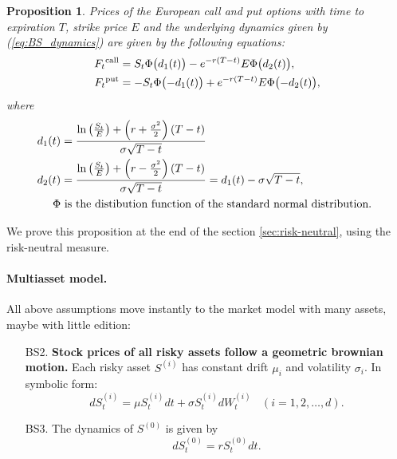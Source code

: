 \documentclass[a4paper,12pt, oneside]{book}
\newtheorem{prop}[thm]{Proposition}
\theoremstyle{definition}
\theoremstyle{remark}
\begin{document}
\begin{prop}
\label{prop:BSFormula}
Prices of the European call and put options with time to expiration $T$, strike price $E$ and the underlying dynamics given by (\ref{eq:BS_dynamics}) are given by the following equations:
\begin{equation*}
  \begin{split}
    F_t\textsuperscript{call} &= S_t \Phi\bigl( d_1(t) \bigr) - e^{-r(T-t)} E \Phi\bigl(d_2(t) \bigr),\\
    F_t\textsuperscript{put} &= -S_t \Phi\bigl(-d_1(t) \bigr) + e^{-r(T-t)} E \Phi\bigl(-d_2(t) \bigr), 
  \end{split}
\end{equation*}
where
\begin{align*}
d_1(t) &= \frac{\ln\left(\frac{S_t}{E}\right)+\left(r+\frac{\sigma^{2}}{2}\right)(T-t)}{\sigma\sqrt{T-t}}\\
d_2(t) &= \frac{\ln\left(\frac{S_t}{E}\right)+\left(r-\frac{\sigma^{2}}{2}\right)(T-t)}{\sigma\sqrt{T-t}} = d_{1}(t)-\sigma\sqrt{T-t},\\
\Phi & \hbox{ is the distibution function of the standard normal distribution. } 
\end{align*}
\end{prop}
We prove this proposition at the end of the section \ref{sec:risk-neutral}, using the risk-neutral measure.

\paragraph{Multiasset model.}
All above assumptions move instantly to the market model with many assets, maybe with little edition:
\begin{enumerate}
 \item[BS2.] \textbf{Stock prices of all risky assets follow a geometric brownian motion.} Each risky asset $S^{(i)}$ has constant drift $\mu_i$ and volatility $\sigma_i$. In symbolic form:
\begin{equation}
 \label{eq:BS_multi_dynamics}
 dS^{(i)}_t = \mu S^{(i)}_t dt + \sigma S^{(i)}_t dW^{(i)}_t\ \ \ \ (i=1,2,\ldots,d). 
\end{equation}
  \item[BS3.]  The dynamics of $S^{(0)}$ is given by 
\[ dS^{(0)}_t = rS^{(0)}_t dt. \]
\end{enumerate}
  
\end{document}
